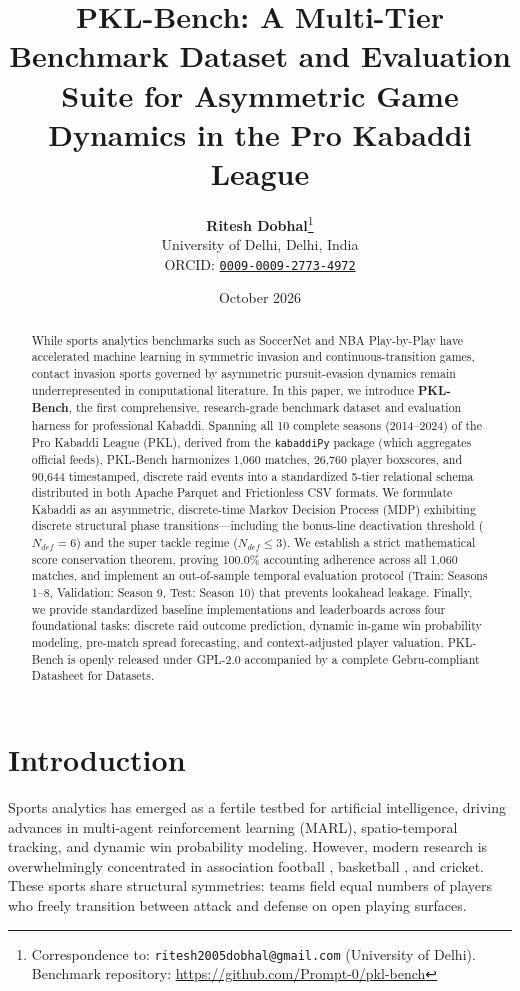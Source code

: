 \documentclass[11pt,a4paper]{article}
\title{\textbf{PKL-Bench: A Multi-Tier Benchmark Dataset and Evaluation Suite for Asymmetric Game Dynamics in the Pro Kabaddi League}}
\author{
  \textbf{Ritesh Dobhal}\thanks{Correspondence to: \texttt{ritesh2005dobhal@gmail.com} (University of Delhi). Benchmark repository: \url{https://github.com/Prompt-0/pkl-bench}} \\
  University of Delhi, Delhi, India \\
  \small ORCID: \href{https://orcid.org/0009-0009-2773-4972}{\texttt{0009-0009-2773-4972}}
}
\date{October 2026}
\begin{document}
\maketitle

\begin{abstract}
While sports analytics benchmarks such as SoccerNet and NBA Play-by-Play have accelerated machine learning in symmetric invasion and continuous-transition games, contact invasion sports governed by asymmetric pursuit-evasion dynamics remain underrepresented in computational literature. In this paper, we introduce \textbf{PKL-Bench}, the first comprehensive, research-grade benchmark dataset and evaluation harness for professional Kabaddi. Spanning all 10 complete seasons (2014--2024) of the Pro Kabaddi League (PKL), derived from the \texttt{kabaddiPy} package \cite{lalwani2024kabaddipy} (which aggregates official feeds), PKL-Bench harmonizes 1,060 matches, 26,760 player boxscores, and 90,644 timestamped, discrete raid events into a standardized 5-tier relational schema distributed in both Apache Parquet and Frictionless CSV formats. We formulate Kabaddi as an asymmetric, discrete-time Markov Decision Process (MDP) exhibiting discrete structural phase transitions---including the bonus-line deactivation threshold ($N_{def} = 6$) and the super tackle regime ($N_{def} \le 3$). We establish a strict mathematical score conservation theorem, proving 100.0\% accounting adherence across all 1,060 matches, and implement an out-of-sample temporal evaluation protocol (Train: Seasons 1--8, Validation: Season 9, Test: Season 10) that prevents lookahead leakage. Finally, we provide standardized baseline implementations and leaderboards across four foundational tasks: discrete raid outcome prediction, dynamic in-game win probability modeling, pre-match spread forecasting, and context-adjusted player valuation. PKL-Bench is openly released under GPL-2.0 accompanied by a complete Gebru-compliant Datasheet for Datasets.
\end{abstract}

\section{Introduction}
Sports analytics has emerged as a fertile testbed for artificial intelligence, driving advances in multi-agent reinforcement learning (MARL), spatio-temporal tracking, and dynamic win probability modeling. However, modern research is overwhelmingly concentrated in association football \cite{deliege2021soccernet, pappalardo2019public}, basketball \cite{franks2015characterizing}, and cricket. These sports share structural symmetries: teams field equal numbers of players who freely transition between attack and defense on open playing surfaces.
\end{document}
